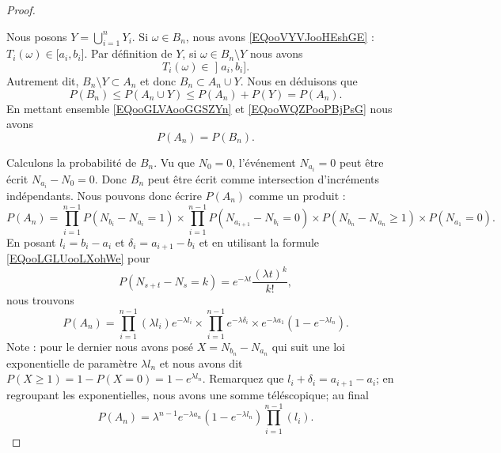 \begin{proof}
\begin{subproof}
		Nous posons \( Y=\bigcup_{i=1}^nY_i\).
		\spitem[\( P(B_n)\leq P(A_n)\)]
		Si \( \omega\in B_n\), nous avons \eqref{EQooVYVJooHEshGE} : \( T_i(\omega)\in \mathopen[ a_i , b_i \mathclose]\). Par définition de \( Y\), si \( \omega\in B_n\setminus Y\) nous avons
		\begin{equation}
			T_i(\omega)\in \mathopen] a_i , b_i \mathclose].
		\end{equation}
		Autrement dit, \( B_n\setminus Y\subset A_n\) et donc \( B_n\subset A_n\cup Y\). Nous en déduisons que
		\begin{equation}    \label{EQooWQZPooPBjPsG}
			P(B_n)\leq P(A_n\cup Y)\leq P(A_n)+P(Y)=P(A_n).
		\end{equation}
		\spitem[\( P(A_n)=P(B_n)\)]
		En mettant ensemble \eqref{EQooGLVAooGGSZYn} et \eqref{EQooWQZPooPBjPsG} nous avons
		\begin{equation}
			P(A_n)=P(B_n).
		\end{equation}
	\end{subproof}
	Calculons la probabilité de \( B_n\). Vu que \( N_0=0\), l'événement \( N_{a_i}=0\) peut être écrit \( N_{a_i}-N_0=0\). Donc \( B_n\) peut être écrit comme intersection d'incréments indépendants. Nous pouvons donc écrire \( P(A_n)\) comme un produit :
	\begin{equation}
		P(A_n)=\prod_{i=1}^{n-1}P(N_{b_i}-N_{a_i}=1)\times\prod_{i=1}^{n-1}P(N_{a_{i+1}}-N_{b_i}=0)\times P(N_{b_n}-N_{a_n}\geq 1)\times P(N_{a_1}=0).
	\end{equation}
	En posant \( l_i=b_i-a_i\) et \( \delta_i=a_{i+1}-b_i\) et en utilisant la formule \eqref{EQooLGLUooLXohWe} pour
	\begin{equation}
		P(N_{s+t}-N_s=k)= e^{-\lambda t}\frac{ (\lambda t)^k }{ k! },
	\end{equation}
	nous trouvons
	\begin{equation}
		P(A_n)=\prod_{i=1}^{n-1}(\lambda l_i) e^{-\lambda l_i}\times \prod_{i=1}^{n-1} e^{-\lambda \delta_i}\times  e^{-\lambda a_1}(1- e^{-\lambda l_n}).
	\end{equation}
	Note : pour le dernier nous avons posé \( X=N_{b_n}-N_{a_n}\) qui suit une loi exponentielle de paramètre \( \lambda l_n\) et nous avons dit $P(X\geq 1)=1-P(X=0)=1- e^{\lambda l_n}$. Remarquez que \( l_i+\delta_i=a_{i+1}-a_i\); en regroupant les exponentielles, nous avons une somme téléscopique; au final
	\begin{equation}
		P(A_n)=\lambda^{n-1} e^{-\lambda a_n}(1- e^{-\lambda l_n})\prod_{i=1}^{n-1}(l_i).
	\end{equation}


\end{proof}
